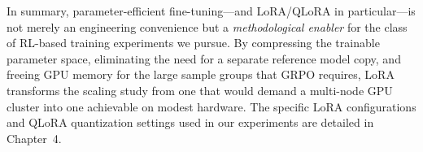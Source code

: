 \medskip
\noindent
In summary, parameter-efficient fine-tuning---and LoRA/QLoRA in
particular---is not merely an engineering convenience but a
\emph{methodological enabler} for the class of RL-based training
experiments we pursue.  By compressing the trainable parameter space,
eliminating the need for a separate reference model copy, and freeing
GPU memory for the large sample groups that GRPO requires, LoRA
transforms the scaling study from one that would demand a multi-node
GPU cluster into one achievable on modest hardware.  The specific
LoRA configurations and QLoRA quantization settings used in our
experiments are detailed in Chapter~4.
